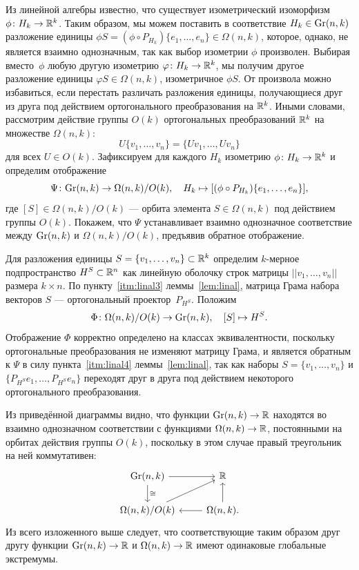 \documentclass[a4paper,12pt]{article}
\def\Gr{\mathbf{\rm Gr}}
\numberwithin{equation}{section}
\begin{document}
	Из линейной алгебры известно, что существует изометрический изоморфизм $\phi\colon H_k\to\mathbb {R}^k$. Таким образом, мы можем поставить в соответствие $H_k\in\Gr(n,k)$ разложение единицы $\phi S=(\phi\circ P_{H_k})\{e_1,\ldots,e_n\}\in\Omega(n,k)$, которое, однако, не является взаимно однозначным, так как выбор изометрии $\phi$ произволен. Выбирая вместо~$\phi$ любую другую изометрию $\varphi\colon H_k\to\mathbb {R}^k$, мы получим другое разложение единицы $\varphi S\in\Omega(n,k)$, изометричное $\phi S$. От произвола можно избавиться, если перестать различать разложения единицы, получающиеся друг из друга под действием ортогонального преобразования на $\mathbb {R}^k$. Иными словами, рассмотрим действие группы $O(k)$ ортогональных преобразований $\mathbb {R}^k$ на множестве $\Omega(n,k)$:
		$$U\{v_1,\ldots,v_n\}=\{Uv_1,\ldots,Uv_n\}$$
	для всех $U\in O(k)$. Зафиксируем для каждого $H_k$ изометрию $\phi\colon H_k\to\mathbb {R}^k$ и определим отображение 
		$$\Psi\colon\Gr(n,k)\to\Omega(n,k)/O(k),\quad H_k\mapsto [(\phi\circ P_{H_k})\{e_1,\ldots,e_n\}],$$
	где $[S]\in\Omega(n,k)/O(k)$ --- орбита элемента $S\in\Omega(n,k)$ под действием группы $O(k)$.
	Покажем, что $\Psi$ устанавливает взаимно однозначное соответствие между $\Gr(n,k)$ и $\Omega(n,k)/O(k)$, предъявив обратное отображение.

	Для разложения единицы $S=\{v_1,\ldots,v_n\}\subset\mathbb {R}^k$ определим $k$-мерное подпространство $H^S\subset\mathbb {R}^n$ как линейную оболочку строк матрицы $||v_1,\ldots,v_n||$ размера $k\times n$. По пункту~\ref{itm:linal3} леммы~\ref{lem:linal}, матрица Грама набора векторов $S$ --- ортогональный проектор~$P_{H^S}$. Положим %
		$$\Phi\colon\Omega(n,k)/O(k)\to\Gr(n,k),\quad [S]\mapsto H^S.$$
	Отображение $\Phi$ корректно определено на классах эквивалентности, поскольку ортогональные преобразования не изменяют матрицу Грама, и является обратным к $\Psi$ в силу пункта~\ref{itm:linal4} леммы~\ref{lem:linal}, так как наборы $S=\{v_1,\ldots,v_n\}$ и $\{P_{H^S}e_1,\ldots,P_{H^S}e_n\}$ переходят друг в друга под действием некоторого ортогонального преобразования.
	
	Из приведённой диаграммы видно, что функции $\Gr(n,k)\to\RR$ находятся во взаимно однозначном соответствии с функциями $\Omega(n,k)\to\mathbb {R}$, постоянными на орбитах действия группы $O(k)$, поскольку в этом случае правый треугольник на ней коммутативен: 
		\[
		\begin{tikzcd}
		\Gr(n,k) \arrow{r} \arrow{d}{\cong} & \mathbb{R} \\                       
		\Omega(n,k)/O(k) \arrow{ru} & \Omega(n,k). \arrow{u} \arrow{l} 
		\end{tikzcd}
		\]
	Из всего изложенного выше следует, что соответствующие таким образом друг другу функции $\Gr(n,k)\to\RR$ и $\Omega(n,k)\to\mathbb {R}$ имеют одинаковые глобальные экстремумы.
\end{document}
